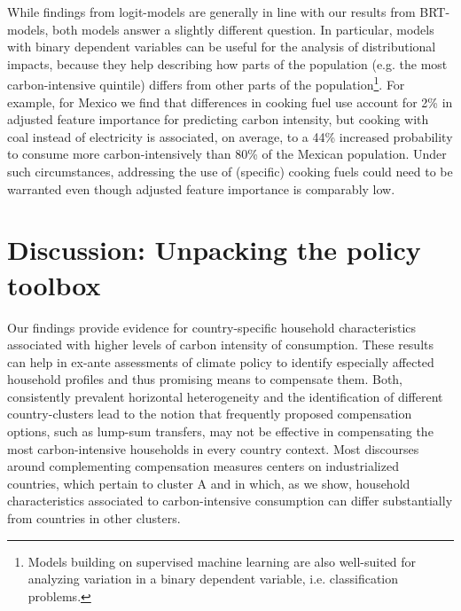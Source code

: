 \documentclass[12pt, a4paper]{article}
\begin{document}
While findings from logit-models are generally in line with our results from BRT-models, both models answer a slightly different question. In particular, models with binary dependent variables can be useful for the analysis of distributional impacts, because they help describing how parts of the population (e.g. the most carbon-intensive quintile) differs from other parts of the population\footnote{Models building on supervised machine learning are also well-suited for analyzing variation in a binary dependent variable, i.e. classification problems.}. For example, for Mexico we find that differences in cooking fuel use account for 2\% in adjusted feature importance for predicting carbon intensity, but cooking with coal instead of electricity is associated, on average, to a 44\% increased probability to consume more carbon-intensively than 80\% of the Mexican population. Under such circumstances, addressing the use of (specific) cooking fuels could need to be warranted even though adjusted feature importance is comparably low.

\section{Discussion: Unpacking the policy toolbox} \label{sec:discussion}

Our findings provide evidence for country-specific household characteristics associated with higher levels of carbon intensity of consumption. These results can help in ex-ante assessments of climate policy to identify especially affected household profiles and thus promising means to compensate them. Both, consistently prevalent horizontal heterogeneity and the identification of different country-clusters lead to the notion that frequently proposed compensation options, such as lump-sum transfers, may not be effective in compensating the most carbon-intensive households in every country context. Most discourses around complementing compensation measures centers on industrialized countries, which pertain to cluster A and in which, as we show, household characteristics associated to carbon-intensive consumption can differ substantially from countries in other clusters.
\end{document}
